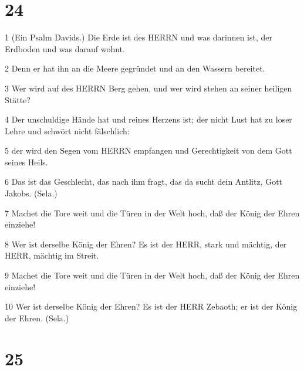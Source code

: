\chapter{24}

\par 1 (Ein Psalm Davids.) Die Erde ist des HERRN und was darinnen ist, der Erdboden und was darauf wohnt.
\par 2 Denn er hat ihn an die Meere gegründet und an den Wassern bereitet.
\par 3 Wer wird auf des HERRN Berg gehen, und wer wird stehen an seiner heiligen Stätte?
\par 4 Der unschuldige Hände hat und reines Herzens ist; der nicht Lust hat zu loser Lehre und schwört nicht fälschlich:
\par 5 der wird den Segen vom HERRN empfangen und Gerechtigkeit von dem Gott seines Heils.
\par 6 Das ist das Geschlecht, das nach ihm fragt, das da sucht dein Antlitz, Gott Jakobs. (Sela.)
\par 7 Machet die Tore weit und die Türen in der Welt hoch, daß der König der Ehren einziehe!
\par 8 Wer ist derselbe König der Ehren? Es ist der HERR, stark und mächtig, der HERR, mächtig im Streit.
\par 9 Machet die Tore weit und die Türen in der Welt hoch, daß der König der Ehren einziehe!
\par 10 Wer ist derselbe König der Ehren? Es ist der HERR Zebaoth; er ist der König der Ehren. (Sela.)

\chapter{25}

